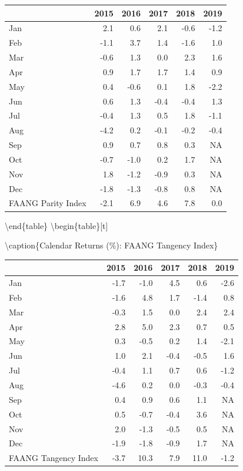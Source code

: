 \documentclass[]{book}
\theoremstyle{definition}
\theoremstyle{definition}
\theoremstyle{definition}
\theoremstyle{remark}
\begin{document}
\begin{tabular}{lrrrrr}
\toprule
  & 2015 & 2016 & 2017 & 2018 & 2019\\
\midrule
Jan & 2.1 & 0.6 & 2.1 & -0.6 & -1.2\\
Feb & -1.1 & 3.7 & 1.4 & -1.6 & 1.0\\
Mar & -0.6 & 1.3 & 0.0 & 2.3 & 1.6\\
Apr & 0.9 & 1.7 & 1.7 & 1.4 & 0.9\\
May & 0.4 & -0.6 & 0.1 & 1.8 & -2.2\\
\addlinespace
Jun & 0.6 & 1.3 & -0.4 & -0.4 & 1.3\\
Jul & -0.4 & 1.3 & 0.5 & 1.8 & -1.1\\
Aug & -4.2 & 0.2 & -0.1 & -0.2 & -0.4\\
Sep & 0.9 & 0.7 & 0.8 & 0.3 & NA\\
Oct & -0.7 & -1.0 & 0.2 & 1.7 & NA\\
\addlinespace
Nov & 1.8 & -1.2 & -0.9 & 0.3 & NA\\
Dec & -1.8 & -1.3 & -0.8 & 0.8 & NA\\
FAANG Parity Index & -2.1 & 6.9 & 4.6 & 7.8 & 0.0\\
\bottomrule
\end{tabular}

\textbackslash{}end\{table\} \textbackslash{}begin\{table\}{[}t{]}

\textbackslash{}caption\{\label{tab:calrettangency}Calendar Returns (\%):
FAANG Tangency Index\} \centering

\begin{tabular}{lrrrrr}
\toprule
  & 2015 & 2016 & 2017 & 2018 & 2019\\
\midrule
Jan & -1.7 & -1.0 & 4.5 & 0.6 & -2.6\\
Feb & -1.6 & 4.8 & 1.7 & -1.4 & 0.8\\
Mar & -0.3 & 1.5 & 0.0 & 2.4 & 2.4\\
Apr & 2.8 & 5.0 & 2.3 & 0.7 & 0.5\\
May & 0.3 & -0.5 & 0.2 & 1.4 & -2.1\\
\addlinespace
Jun & 1.0 & 2.1 & -0.4 & -0.5 & 1.6\\
Jul & -0.4 & 1.1 & 0.7 & 0.6 & -1.2\\
Aug & -4.6 & 0.2 & 0.0 & -0.3 & -0.4\\
Sep & 0.4 & 0.9 & 0.6 & 1.1 & NA\\
Oct & 0.5 & -0.7 & -0.4 & 3.6 & NA\\
\addlinespace
Nov & 2.0 & -1.3 & -0.5 & 0.5 & NA\\
Dec & -1.9 & -1.8 & -0.9 & 1.7 & NA\\
FAANG Tangency Index & -3.7 & 10.3 & 7.9 & 11.0 & -1.2\\
\bottomrule
\end{tabular}
\end{document}

